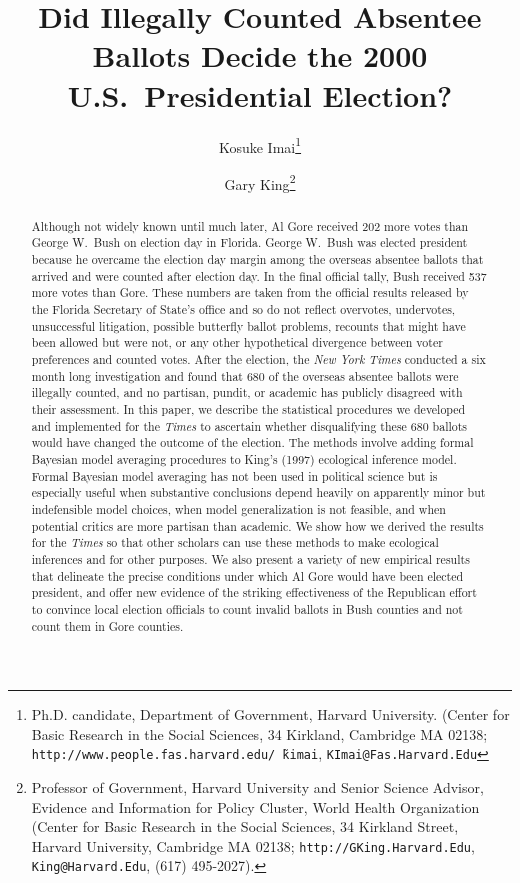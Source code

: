 \documentclass[11pt,titlepage]{article}
\title{Did Illegally Counted Absentee Ballots Decide the 2000 U.S.\ 
  Presidential Election?}
\author{Kosuke Imai\thanks{Ph.D. candidate, Department of Government,
    Harvard University. (Center for Basic Research in the Social
    Sciences, 34 Kirkland, Cambridge MA 02138;
    \texttt{http://www.people.fas.harvard.edu/\~\,kimai},
    \texttt{KImai@Fas.Harvard.Edu}}
\and %
Gary King\thanks{Professor of Government, Harvard University and
  Senior Science Advisor, Evidence and Information for Policy Cluster,
  World Health Organization (Center for Basic Research in the Social
  Sciences, 34 Kirkland Street, Harvard University, Cambridge MA
  02138; \texttt{http://GKing.Harvard.Edu}, \texttt{King@Harvard.Edu},
  (617) 495-2027).}  }
\begin{document}
\maketitle

\begin{abstract}
  Although not widely known until much later, Al Gore received 202
  more votes than George W.\ Bush on election day in Florida.  George
  W.\ Bush was elected president because he overcame the election day
  margin among the overseas absentee ballots that arrived and were
  counted after election day.  In the final official tally, Bush
  received 537 more votes than Gore.  These numbers are taken from the
  official results released by the Florida Secretary of State's office
  and so do not reflect overvotes, undervotes, unsuccessful
  litigation, possible butterfly ballot problems, recounts that might
  have been allowed but were not, or any other hypothetical divergence
  between voter preferences and counted votes.  After the election,
  the \emph{New York Times} conducted a six month long investigation
  and found that 680 of the overseas absentee ballots were illegally
  counted, and no partisan, pundit, or academic has publicly disagreed
  with their assessment.  In this paper, we describe the statistical
  procedures we developed and implemented for the \emph{Times} to
  ascertain whether disqualifying these 680 ballots would have changed
  the outcome of the election.  The methods involve adding formal
  Bayesian model averaging procedures to King's (1997) ecological
  inference model.  Formal Bayesian model averaging has not been used
  in political science but is especially useful when substantive
  conclusions depend heavily on apparently minor but indefensible
  model choices, when model generalization is not feasible, and when
  potential critics are more partisan than academic.  We show how we
  derived the results for the \emph{Times} so that other scholars can
  use these methods to make ecological inferences and for other
  purposes.  We also present a variety of new empirical results that
  delineate the precise conditions under which Al Gore would have been
  elected president, and offer new evidence of the striking
  effectiveness of the Republican effort to convince local election
  officials to count invalid ballots in Bush counties and not count
  them in Gore counties.
\end{abstract}

\end{document}
